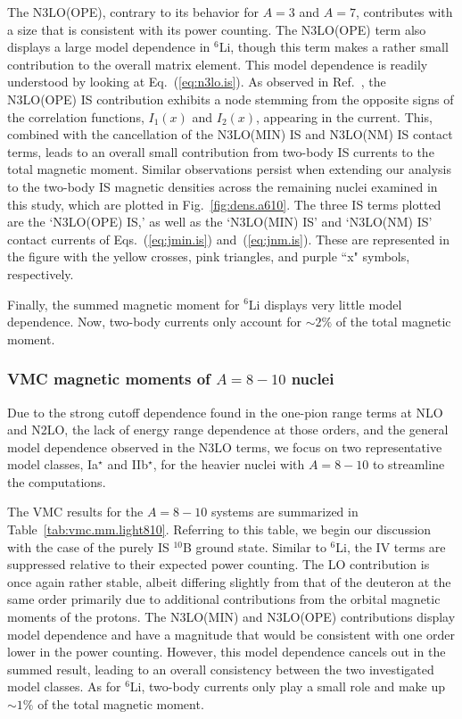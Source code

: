 \documentclass[aps,prc,floatfix,showpacs,twocolumn, preprintnumbers]{revtex4-2}
\begin{document}
The N3LO(OPE), contrary to its behavior for $A=3$ and $A=7$, contributes with a size that is consistent with its power counting. The N3LO(OPE) term also displays a large model dependence in $^6$Li, though this term makes a rather small contribution to the overall matrix element. This model dependence is readily understood by looking at Eq.~(\ref{eq:n3lo.is}). As observed in Ref.~\cite{Schiavilla:2018udt}, the N3LO(OPE) IS contribution exhibits a node stemming from the opposite signs of the correlation functions, $I_1(x)$ and $I_2(x)$, appearing in the current. This, combined with the cancellation of the N3LO(MIN) IS  and N3LO(NM) IS  contact terms, leads to an overall small contribution from  two-body IS currents to the total magnetic moment. Similar observations persist when extending our analysis to the two-body IS  magnetic densities across the remaining nuclei examined in this study, which are plotted in Fig.~\ref{fig:dens.a610}. The three IS terms plotted are the `N3LO(OPE) IS,' as well as the `N3LO(MIN) IS'  and `N3LO(NM) IS' contact currents of Eqs.~(\ref{eq:jmin.is}) and~(\ref{eq:jnm.is}). These are represented in the figure with the yellow crosses, pink triangles, and purple ``x" symbols, respectively. 

Finally, the summed magnetic moment for $^6$Li displays very little model dependence. Now, two-body currents only account for ${\sim}2\%$ of the total magnetic moment. 

\subsubsection{VMC magnetic moments of $A=8-10$ nuclei}

Due to the strong cutoff dependence found in the one-pion range terms at NLO and N2LO, the lack of energy range dependence at those orders, and the general model dependence observed in the N3LO terms, we focus on two representative model classes, Ia$^{\star}$ and IIb$^{\star}$, for the heavier nuclei with $A=8-10$ to streamline the computations.

The VMC results for the $A=8-10$ systems are summarized in Table~\ref{tab:vmc.mm.light810}. Referring to this table, we begin our discussion with the case of the purely IS $^{10}$B ground state. Similar to $^6$Li, the IV terms are suppressed relative to their expected power counting. The LO contribution is once again rather stable, albeit differing slightly from that of the deuteron at the same order primarily due to additional contributions from the orbital magnetic moments of the protons. The N3LO(MIN) and N3LO(OPE) contributions display model dependence and have a magnitude that would be consistent with one order lower in the power counting. However, this model dependence cancels out in the summed result, leading to an overall consistency between the two  investigated model classes. As for $^6$Li, two-body currents only play a small role and make up ${\sim}1\%$ of the total magnetic moment.
\end{document}
